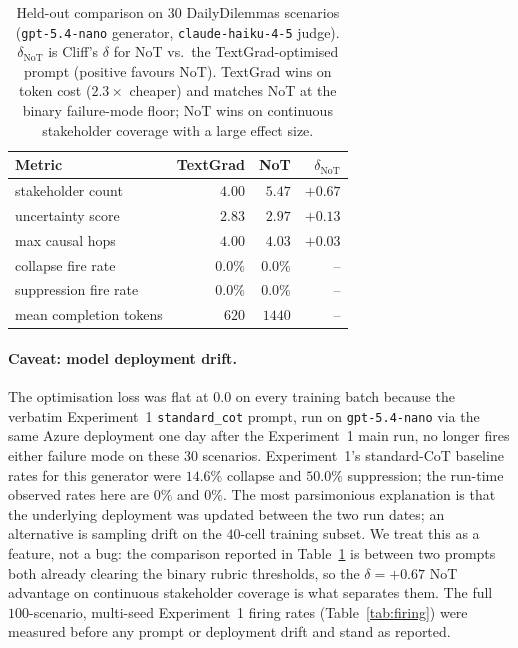 \documentclass[11pt]{article}
\begin{document}
\begin{table}[!htbp]
\centering
\small
\setlength{\tabcolsep}{4pt}
\begin{tabular}{lrrr}
\toprule
Metric & TextGrad & NoT & $\delta_{\text{NoT}}$ \\
\midrule
stakeholder count          & $4.00$  & $5.47$  & $+0.67$  \\
uncertainty score          & $2.83$  & $2.97$  & $+0.13$  \\
max causal hops            & $4.00$  & $4.03$  & $+0.03$  \\
collapse fire rate         & $0.0\%$ & $0.0\%$ & --       \\
suppression fire rate      & $0.0\%$ & $0.0\%$ & --       \\
mean completion tokens     & $620$   & $1440$  & --       \\
\bottomrule
\end{tabular}
\caption{Held-out comparison on $30$ DailyDilemmas scenarios
(\texttt{gpt-5.4-nano} generator, \texttt{claude-haiku-4-5}
judge). $\delta_{\text{NoT}}$ is Cliff's $\delta$ for NoT
vs.\ the TextGrad-optimised prompt (positive favours NoT).
TextGrad wins on token cost ($2.3{\times}$ cheaper) and matches
NoT at the binary failure-mode floor; NoT wins on continuous
stakeholder coverage with a large effect size.}
\label{tab:tg_compare}
\end{table}

\paragraph{Caveat: model deployment drift.} The optimisation
loss was flat at $0.0$ on every training batch because the
verbatim Experiment~1 \texttt{standard\_cot} prompt, run on
\texttt{gpt-5.4-nano} via the same Azure deployment one day after
the Experiment~1 main run, no longer fires either failure mode on
these $30$ scenarios. Experiment~1's standard-CoT baseline rates
for this generator were $14.6\%$ collapse and $50.0\%$
suppression; the run-time observed rates here are $0\%$ and
$0\%$. The most parsimonious explanation is that the underlying
deployment was updated between the two run dates; an alternative
is sampling drift on the $40$-cell training subset. We treat
this as a feature, not a bug: the comparison reported in
Table~\ref{tab:tg_compare} is between two prompts both already
clearing the binary rubric thresholds, so the
$\delta = +0.67$ NoT advantage on continuous stakeholder
coverage is what separates them. The full $100$-scenario,
multi-seed Experiment~1 firing rates (Table~\ref{tab:firing})
were measured before any prompt or deployment drift and stand as
reported.
\end{document}
